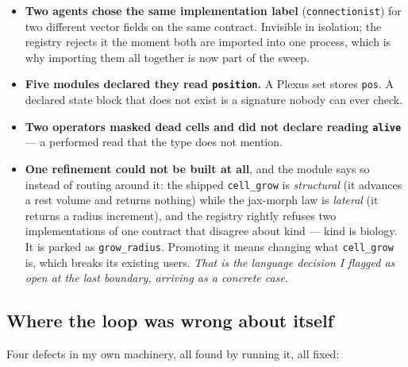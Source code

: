 \documentclass[11pt,a4paper]{article}
\newcommand{\code}[1]{\texttt{#1}}
\begin{document}
\begin{itemize}
\item \textbf{Two agents chose the same implementation label} (\code{connectionist}) for two
different vector fields on the same contract. Invisible in isolation; the registry rejects it the
moment both are imported into one process, which is why importing them all together is now part
of the sweep.
\item \textbf{Five modules declared they read \code{position}.} A Plexus set stores \code{pos}. A
declared state block that does not exist is a signature nobody can ever check.
\item \textbf{Two operators masked dead cells and did not declare reading \code{alive}} --- a
performed read that the type does not mention.
\item \textbf{One refinement could not be built at all}, and the module says so instead of routing
around it: the shipped \code{cell\_grow} is \emph{structural} (it advances a rest volume and
returns nothing) while the jax-morph law is \emph{lateral} (it returns a radius increment), and
the registry rightly refuses two implementations of one contract that disagree about kind ---
kind is biology. It is parked as \code{grow\_radius}. Promoting it means changing what
\code{cell\_grow} is, which breaks its existing users. \emph{That is the language decision I
flagged as open at the last boundary, arriving as a concrete case.}
\end{itemize}

\subsection{Where the loop was wrong about itself}

Four defects in my own machinery, all found by running it, all fixed:
\end{document}
